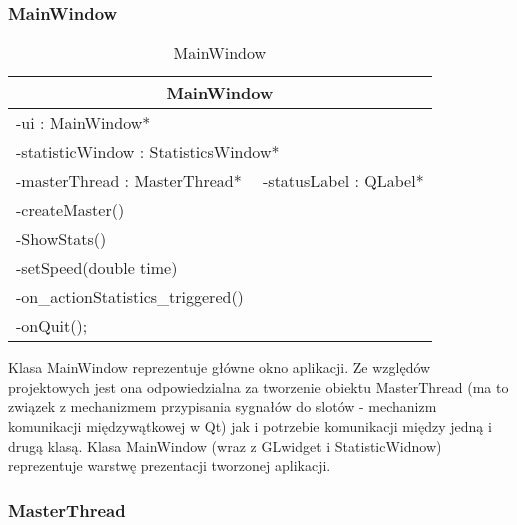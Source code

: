 \subsubsection{MainWindow}

\footnotesize
\begin{longtable}{|p{14cm}|}
    \caption{MainWindow} \label{tab:MainWindow} \\ \hline
    \multicolumn{1}{|c|}{MainWindow} \\ \hline
    -ui : MainWindow* \\
    -statisticWindow : StatisticsWindow* \\
    -masterThread : MasterThread* \ \
    -statusLabel : QLabel* \\ \hline
    -createMaster() \\
    -ShowStats() \\
    -setSpeed(double time) \\
    -on\_actionStatistics\_triggered() \\
    -onQuit(); \\ \hline
\end{longtable}
\normalsize

Klasa MainWindow reprezentuje główne okno aplikacji. Ze względów projektowych jest ona odpowiedzialna za tworzenie obiektu MasterThread (ma to związek z mechanizmem przypisania sygnałów do slotów - mechanizm komunikacji międzywątkowej w Qt) jak i potrzebie komunikacji między jedną i drugą klasą. Klasa MainWindow (wraz z GLwidget i StatisticWidnow) reprezentuje warstwę prezentacji tworzonej aplikacji.

\subsubsection{MasterThread}

